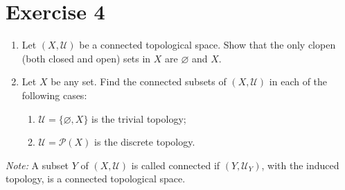 \documentclass[12pt]{article}
\begin{document}
\newpage
\section*{Exercise 4}
\begin{enumerate}
\item[a)] Let $(X,\mathcal{U})$ be a connected topological space. Show that the only clopen (both closed and open) sets in $X$ are $\varnothing$ and $X$.
\item[b)] Let $X$ be any set. Find the connected subsets of $(X,\mathcal{U})$ in each of the following cases:
\begin{enumerate}
\item[i)] $\mathcal{U}=\{\varnothing,X\}$ is the trivial topology;
\item[ii)] $\mathcal{U}=\mathcal{P}(X)$ is the discrete topology.
\end{enumerate}
\end{enumerate}
\noindent\textit{Note:} A subset $Y$ of $(X,\mathcal{U})$ is called connected if $(Y,\mathcal{U}_Y)$, with the induced topology, is a connected topological space.
\end{document}
